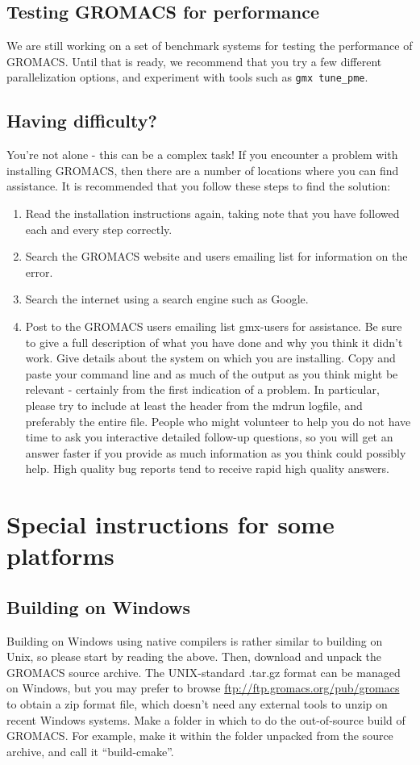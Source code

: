 \documentclass{article}[12pt,a4paper,twoside]
\newcommand{\gromacs}{GROMACS}
\begin{document}
\subsection{Testing \gromacs{} for performance}
We are still working on a set of benchmark systems for testing
the performance of \gromacs{}. Until that is ready, we recommend that
you try a few different parallelization options, and experiment with
tools such as \verb+gmx tune_pme+.

\subsection{Having difficulty?}
You're not alone - this can be a complex task! If you encounter a
problem with installing \gromacs{}, then there are a number of
locations where you can find assistance. It is recommended that you
follow these steps to find the solution:

\begin{enumerate}
\item Read the installation instructions again, taking note that you
  have followed each and every step correctly.
\item Search the \gromacs{} website and users emailing list for
  information on the error.
\item Search the internet using a search engine such as Google.
\item Post to the \gromacs{} users emailing list gmx-users for
  assistance. Be sure to give a full description of what you have done
  and why you think it didn't work. Give details about the system on
  which you are installing. 
  Copy and paste your command line and as
  much of the output as you think might be relevant - certainly from
  the first indication of a problem. In particular, please try to include at
  least the header from the mdrun logfile, and preferably the entire file.
  People who might volunteer to
  help you do not have time to ask you interactive detailed follow-up
  questions, so you will get an answer faster if you provide as much
  information as you think could possibly help. High quality bug reports 
  tend to receive rapid high quality answers.
\end{enumerate}

\section{Special instructions for some platforms}

\subsection{Building on Windows}
Building on Windows using native compilers is rather similar to
building on Unix, so please start by reading the above. Then, download
and unpack the GROMACS source archive. The UNIX-standard .tar.gz
format can be managed on Windows, but you may prefer to browse
\url{ftp://ftp.gromacs.org/pub/gromacs} to obtain a zip format file,
which doesn't need any external tools to unzip on recent Windows
systems. Make a folder in which to do the out-of-source build of
\gromacs{}. For example, make it within the folder unpacked from the
source archive, and call it ``build-cmake''. 
\end{document}
